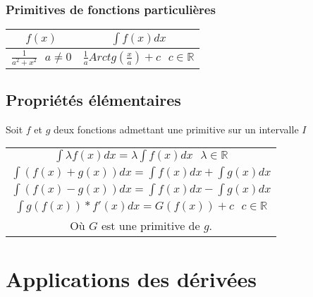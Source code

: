 \documentclass[12pt, a4paper]{book}
\begin{document}
\subsubsection{Primitives de fonctions particulières}
\begin{center}
    \begin{tabular}{|c|c|}
        \hline
       $f(x)$ & $\int f(x)dx$\\
        \hline
        $\frac{1}{a^2+x^2} \ \ \ a \not = 0$& $\frac{1}{a}Arctg(\frac{x}{a})+c \ \ \ c \in \mathbb{R}$\\
        
        \hline
    \end{tabular}
\end{center}
\newpage
\subsection{Propriétés élémentaires}
Soit $f$ et $g$ deux fonctions admettant une primitive sur un intervalle $I$
\begin{center}
    \begin{tabular}{|c|}
        \hline
        $\int \lambda f(x)dx = \lambda \int f(x)dx \ \ \ \lambda \in \mathbb{R}$\\
        $\int (f(x)+g(x))dx = \int f(x)dx + \int g(x)dx $\\
        $\int (f(x)-g(x))dx = \int f(x)dx - \int g(x)dx $\\
        $\int g(f(x))*f'(x)dx = G(f(x)) + c \ \ \ c \in \mathbb{R}$\\
        Où $G$ est une primitive de $g$.\\
        \hline
    \end{tabular}
\end{center}
\newpage
\section{Applications des dérivées}
\end{document}
